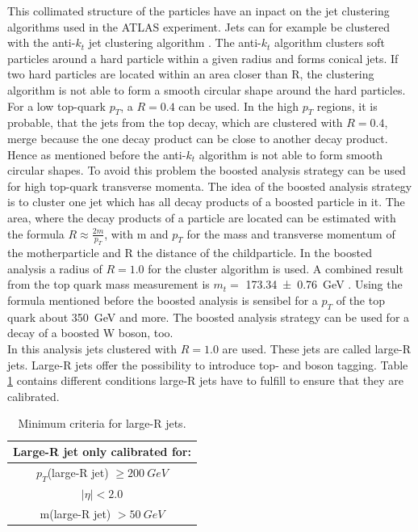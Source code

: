 This collimated structure of the particles have an inpact on the jet clustering algorithms used in the ATLAS experiment.
Jets can for example be clustered with the anti-$k_{t}$ jet clustering algorithm \cite{antikt}.  
The anti-$k_{t}$ algorithm clusters soft particles around a hard particle within a given radius and forms conical jets. 
If two hard particles are located within an area closer than R, the clustering algorithm is not able to form a smooth circular shape around the hard particles.  
For a low top-quark $p_{T}$, a $R = 0.4$ can be used.
In the high $p_{T}$ regions, it is probable, that the jets from the top decay, which are clustered with $R = 0.4$,  merge because the one decay product can be close to another decay product. 
Hence as mentioned before the anti-$k_{t}$ algorithm is not able to form smooth circular shapes. 
To avoid this problem the boosted analysis strategy can be used for high top-quark transverse momenta.
The idea of the boosted analysis strategy is to cluster one jet which has all decay products of a boosted particle in it.
The area, where the decay products of a particle are located can be estimated with the formula $R \approx \frac{2m}{p_{T}}$, with m and $p_{T}$ for the mass and transverse momentum of the motherparticle and R the distance of the childparticle.
In the boosted analysis a radius of $R = 1.0$ for the cluster algorithm is used. 
A combined result from the top quark mass measurement is $m_{t} =$ \SI{173.34 \pm 0.76}{GeV} \cite{topmass}.
Using the formula mentioned before the boosted analysis is sensibel for a $p_{T}$ of the top quark about \SI{350}{GeV} and more. 
The boosted analysis strategy can be used for a decay of a boosted W boson, too.\\
In this analysis jets clustered with  $R = 1.0$ are used.   
These jets are called large-R jets. 
Large-R jets offer the possibility to introduce top- and boson tagging.
Table \ref{calibration} contains different conditions large-R jets have to fulfill to ensure that they are calibrated.

\begin{table}[h!]
\centering
\setlength{\tabcolsep}{3cm}
\begin{tabular}{|c|} 
\hline
\textbf{Large-R jet only calibrated for:}\\
\hline
\hline
$p_{T}$(large-R jet) $\geq \SI{200}{GeV}$\\
$\mid \eta \mid < 2.0$ \\
m(large-R jet) $> \SI{50}{GeV}$\\
\hline
\end{tabular}
\caption{Minimum criteria for large-R jets.}
\label{calibration}
\end{table}

